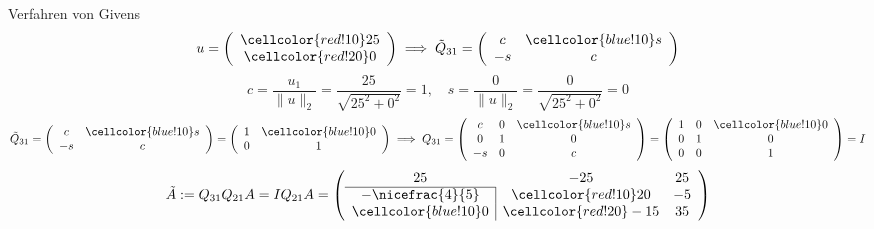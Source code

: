 \begin{example}{Verfahren von Givens}
    \[ 
        u = 
        \left(
        \begin{array}{c}
                \cellcolor{red!10} 25 \\ 
                \cellcolor{red!20} 0 
            \end{array}
        \right)
        \implies 
        \tilde{Q}_{31} = 
        \left(
        \begin{array}{cc}
                c  & \cellcolor{blue!10} s \\ 
                -s & c 
            \end{array}
        \right)
    \]
    \[ 
        c = \frac{u_1}{\|u\|_2} = \frac{25}{\sqrt{25^2 + 0^2}} = 1, \quad s = \frac{0}{\|u\|_2} = \frac{0}{\sqrt{25^2 + 0^2}} = 0
    \]
    \[ 
        \tilde{Q}_{31} = 
        \left(
        \begin{array}{cc}
                c  & \cellcolor{blue!10} s \\ 
                -s & c 
            \end{array}
        \right)
        =
        \left(
        \begin{array}{cc}
                1 & \cellcolor{blue!10} 0 \\ 
                0 & 1
            \end{array}
        \right)
        \implies 
        Q_{31} = 
        \left(
        \begin{array}{ccc}
                c  & 0 & \cellcolor{blue!10} s \\ 
                0  & 1 & 0                     \\ 
                -s & 0 & c
            \end{array}
        \right) = 
        \left(
        \begin{array}{ccc}
                1 & 0 & \cellcolor{blue!10} 0 \\ 
                0 & 1 & 0                     \\ 
                0 & 0 & 1
            \end{array}
        \right) = I
    \]
    \[ 
        \tilde{A} := Q_{31}Q_{21}A = I Q_{21} A = 
        \left(
        \begin{array}{cccc}
                25                                         & -25                   & 25 \\ \cline{1-1}
                \multicolumn{1}{c|}{-\nicefrac{4}{5}}      & \cellcolor{red!10}20  & -5 \\ 
                \multicolumn{1}{c|}{\cellcolor{blue!10} 0} & \cellcolor{red!20}-15 & 35
            \end{array}
        \right)
    \]
    

\end{example}
